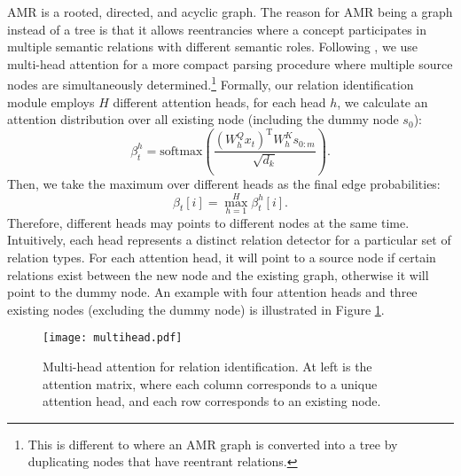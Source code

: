 \documentclass[11pt,a4paper]{article}
\begin{document}
	AMR is a rooted, directed, and acyclic graph. The reason for AMR being a graph instead of a tree is that it allows reentrancies where a concept participates in multiple semantic relations with different semantic roles. Following , we use multi-head attention for a more compact parsing procedure where multiple source nodes are simultaneously determined.\footnote{This is different to  where an AMR graph is converted into a tree by duplicating nodes that have reentrant relations.} Formally, our relation identification module employs $H$ different attention heads, for each head $h$, we calculate an attention distribution over all existing node (including the dummy node $s_0$):
	\begin{equation}
	\beta^h_t = \text{softmax}(\frac{(W^{Q}_hx_t)^{\text{T}} W^{K}_h s_{0:m}}{\sqrt{d_k}}).
	\nonumber
	\end{equation}
	Then, we take the maximum over different heads as the final edge probabilities:
	\begin{equation}
	\beta_t[i] = \max_{h=1}^H \beta^h_t[i].
	\nonumber
	\end{equation}
	Therefore, different heads may points to different nodes at the same time. Intuitively, each head represents a distinct relation detector for a particular set of relation types. For each attention head, it will point to a source node if certain relations exist between the new node and the existing graph, otherwise it will point to the dummy node. An example with four attention heads and three existing nodes (excluding the dummy node) is illustrated in Figure \ref{multihead}.
		\begin{figure}[t]
		\centering
		\texttt{[image: multihead.pdf]}
		\caption{Multi-head attention for relation identification. At left is the attention matrix, where each column corresponds to a unique attention head, and each row corresponds to an existing node.}
		\label{multihead}
	\end{figure}
\end{document}
